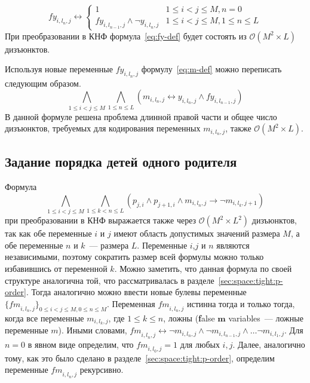 \begin{equation}
\label{eq:fy-def}
  \mathit{fy}_{i,l_{n},j} \leftrightarrow 
    \begin{cases} 
      1                               & 1 \leq i < j \leq M, n = 0 \\
      \mathit{fy}_{i,l_{n - 1},j} \wedge \neg y_{i,l_{n},j}  & 1 \leq i < j \leq M, 1 \leq n \leq L
    \end{cases} 
\end{equation}
%
При преобразовании в КНФ формула~\eqref{eq:fy-def} будет состоять из $\mathcal{O}\left(M^{2} \times L\right)$ дизъюнктов.

Используя новые переменные $\mathit{fy}_{i,l_{n},j}$ формулу~\eqref{eq:m-def} можно переписать следующим образом.
%
\begin{equation}
\label{eq:m-def-tight}
  \bigwedge_{1 \leq i < j \leq M} \bigwedge_{1 \leq n \leq L} \left(m_{i,l_{n},j} \leftrightarrow y_{i,l_{n},j} \wedge \mathit{fy}_{i,l_{n - 1},j} \right)
\end{equation}
%
В данной формуле решена проблема длинной правой части и общее число дизъюнктов, требуемых для кодирования переменных $m_{i,l_{n},j}$, также $\mathcal{O}\left(M^{2} \times L\right)$. 


\subsection{Задание порядка детей одного родителя}
\label{sec:space:tight:m-order}

Формула
\begin{equation*}
\bigwedge_{1 \leq i < j \leq M} \bigwedge_{1 \leq k < n \leq L} \left(p_{j,i} \wedge p_{j + 1, i} \wedge m_{i,l_{n}, j} \rightarrow \neg m_{i, l_{k}, j + 1}\right)
\end{equation*}
при преобразовании в КНФ выражается также через $\mathcal{O}\left(M^{2} \times L^{2}\right)$ дизъюнктов, так как обе переменные $i$ и $j$ имеют область допустимых значений размера $M$, а обе переменные $n$ и $k$~{---} размера $L$.
Переменные $i$,$j$ и $n$ являются независимыми, поэтому сократить размер всей формулы можно только избавившись от переменной $k$.
Можно заметить, что данная формула по своей структуре аналогична той, что рассматривалась в разделе~\ref{sec:space:tight:p-order}.
Тогда аналогично можно ввести новые булевы переменные $\{\mathit{fm}_{i,l_{n},j}\}_{0 \leq i < j \leq M,0 \leq n \leq M}$.
Переменная $\mathit{fm}_{i,l_{n},j}$ истинна тогда и только тогда, когда все переменные $m_{i,l_{k},j}$, где $1 \leq k \leq n$, ложны (\textbf{f}alse $\boldsymbol{m}$ variables~{---} ложные переменные $m$).
Иными словами, $\mathit{fm}_{i,l_{n},j} \leftrightarrow \neg m_{i,l_{n},j} \wedge \neg m_{i, l_{n - 1}, j} \wedge \ldots \neg m_{i,l_{1},j}$. 
Для $n = 0$ в явном виде определим, что $\mathit{fm}_{i,l_{0},j} = 1$ для любых $i,j$.
Далее, аналогично тому, как это было сделано в разделе~\ref{sec:space:tight:p-order}, определим переменные $\mathit{fm}_{i,l_{n},j}$ рекурсивно.

